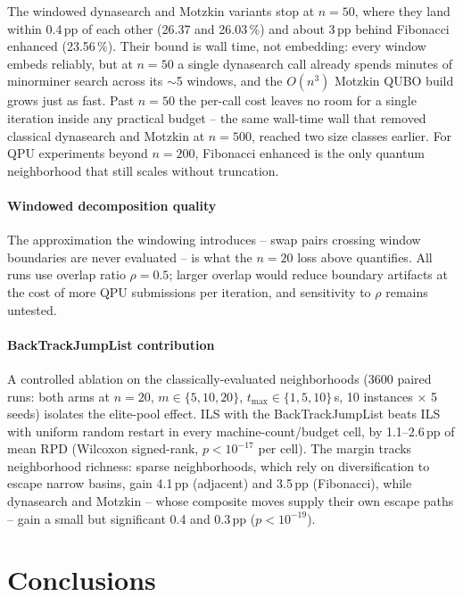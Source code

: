 \documentclass[preprint,12pt,authoryear]{elsarticle}
\begin{document}
The windowed dynasearch and Motzkin variants stop at $n = 50$, where
they land within 0.4\,pp of each other (26.37 and 26.03\,\%) and
about 3\,pp behind Fibonacci enhanced (23.56\,\%). Their bound is
wall time, not embedding: every window embeds reliably, but at
$n = 50$ a single dynasearch call already spends minutes of
minorminer search across its $\sim$5 windows, and the $O(n^3)$
Motzkin QUBO build grows just as fast. Past $n = 50$ the per-call
cost leaves no room for a single iteration inside any practical
budget -- the same wall-time wall that removed classical dynasearch
and Motzkin at $n = 500$, reached two size classes earlier. For QPU
experiments beyond $n = 200$, Fibonacci enhanced is the only quantum
neighborhood that still scales without truncation.

\paragraph{Windowed decomposition quality}
The approximation the windowing introduces -- swap pairs crossing
window boundaries are never evaluated -- is what the $n = 20$ loss
above quantifies. All runs use overlap ratio $\rho = 0.5$; larger
overlap would reduce boundary artifacts at the cost of more QPU
submissions per iteration, and sensitivity to $\rho$ remains untested.

\paragraph{BackTrackJumpList contribution}
A controlled ablation on the classically-evaluated neighborhoods (3600 paired
runs: both arms at $n = 20$, $m \in \{5, 10, 20\}$,
$t_{\max} \in \{1, 5, 10\}$\,s, 10 instances $\times$ 5 seeds) isolates
the elite-pool effect. ILS with the BackTrackJumpList beats ILS with
uniform random restart in every machine-count/budget cell, by
1.1--2.6\,pp of mean RPD (Wilcoxon signed-rank, $p < 10^{-17}$ per
cell). The margin tracks neighborhood richness: sparse neighborhoods,
which rely on diversification to escape narrow basins, gain 4.1\,pp
(adjacent) and 3.5\,pp (Fibonacci), while dynasearch and Motzkin --
whose composite moves supply their own escape paths -- gain a small
but significant 0.4 and 0.3\,pp ($p < 10^{-19}$).

\section{Conclusions}
\end{document}
